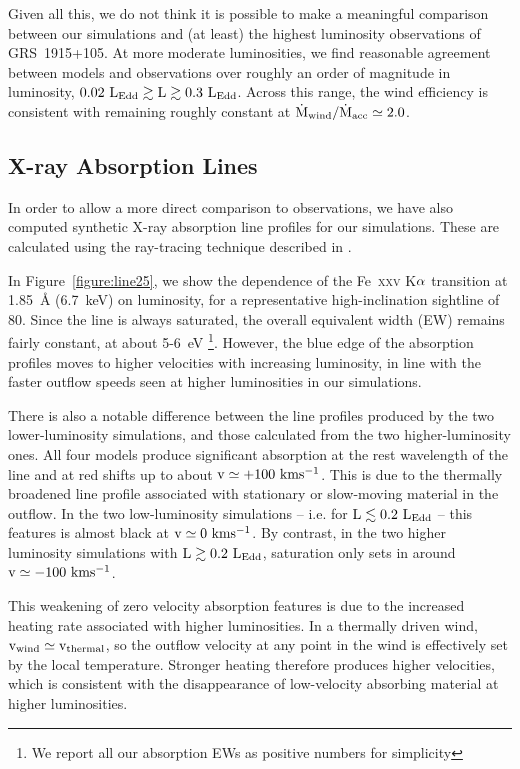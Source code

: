 \documentclass[a4paper,fleqn,usenatbib]{mnras}
\begin{document}
Given all this, we do not think it is possible to make a meaningful
comparison between our simulations and (at least) the highest
luminosity observations of GRS~1915+105. At more moderate luminosities, 
we find reasonable agreement between models and observations over 
roughly an order of magnitude in luminosity,
$\rm{0.02~L_{Edd} \gtrsim L \gtrsim 0.3~L_{Edd}}$. Across this range,
the wind efficiency is consistent with remaining roughly constant at
$\rm{\dot{M}_{wind}/\dot{M}_{acc}} \simeq 2.0$. 

\subsection{X-ray Absorption Lines}
\label{lines}

In order to allow a more direct comparison to observations, we have
also computed synthetic X-ray absorption line profiles for our
simulations. These are calculated using the ray-tracing technique described in
\cite{2015ApJ...807..107H}. 

In Figure~\ref{figure:line25}, we show the dependence of the
Fe~\textsc{xxv} K$\rm{\alpha}$ transition at 1.85~{\AA} (6.7~keV)
on luminosity, for a representative high-inclination sightline of
80\degree. Since the 
line is always saturated, the overall equivalent width (EW) remains
fairly constant, at about 5-6~eV \footnote{We report all our absorption
EWs as positive numbers for simplicity}. However, the blue edge of 
the absorption profiles moves to higher velocities with increasing
luminosity, in line with the faster outflow speeds seen at higher
luminosities in our simulations. 

There is also a notable difference between the line profiles produced
by the two lower-luminosity simulations, and those calculated from the
two higher-luminosity ones. All four models produce significant
absorption at the rest wavelength of the line and at red shifts up to 
about $\rm{v \simeq +100~kms^{-1}}$. This is due to the thermally
broadened line profile associated with stationary or slow-moving
material in the outflow. In the two low-luminosity simulations --
i.e. for $\rm{L \lesssim 0.2~L_{Edd}}$ -- this features is almost black
at $\rm{v \simeq 0~kms^{-1}}$. By contrast, in the two higher
luminosity simulations with $\rm{L \gtrsim 0.2~L_{Edd}}$, saturation 
only sets in around $\rm{v \simeq -100~kms^{-1}}$.

This weakening of zero velocity absorption features is due to the
increased heating rate associated with higher
luminosities. In a thermally driven wind, $\rm{v_{wind} \simeq
v_{thermal}}$, so the outflow velocity at any point in the wind is
effectively set by the local temperature. Stronger heating therefore
produces higher velocities, which is consistent with the disappearance
of low-velocity absorbing material at higher luminosities.
\end{document}
